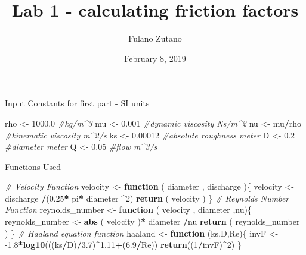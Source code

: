 \documentclass[
]{article}
\title{Lab 1 - calculating friction factors}
\author{Fulano Zutano}
\date{February 8, 2019}
\newenvironment{Shaded}{\begin{snugshade}}{\end{snugshade}}
\newcommand{\CommentTok}[1]{\textcolor[rgb]{0.56,0.35,0.01}{\textit{#1}}}
\newcommand{\ControlFlowTok}[1]{\textcolor[rgb]{0.13,0.29,0.53}{\textbf{#1}}}
\newcommand{\DecValTok}[1]{\textcolor[rgb]{0.00,0.00,0.81}{#1}}
\newcommand{\FloatTok}[1]{\textcolor[rgb]{0.00,0.00,0.81}{#1}}
\newcommand{\KeywordTok}[1]{\textcolor[rgb]{0.13,0.29,0.53}{\textbf{#1}}}
\newcommand{\NormalTok}[1]{#1}
\newcommand{\OperatorTok}[1]{\textcolor[rgb]{0.81,0.36,0.00}{\textbf{#1}}}
\newcommand{\StringTok}[1]{\textcolor[rgb]{0.31,0.60,0.02}{#1}}
\begin{document}
\maketitle

Input Constants for first part - SI units

\begin{Shaded}
\begin{Highlighting}[]
\NormalTok{rho <-}\StringTok{ }\FloatTok{1000.0}    \CommentTok{#kg/m^3}
\NormalTok{mu <-}\StringTok{ }\FloatTok{0.001}      \CommentTok{#dynamic viscosity Ns/m^2}
\NormalTok{nu <-}\StringTok{ }\NormalTok{mu}\OperatorTok{/}\NormalTok{rho     }\CommentTok{#kinematic viscosity m^2/s}
\NormalTok{ks <-}\StringTok{ }\FloatTok{0.00012}    \CommentTok{#absolute roughness meter}
\NormalTok{D <-}\StringTok{ }\FloatTok{0.2}         \CommentTok{#diameter meter}
\NormalTok{Q <-}\StringTok{ }\FloatTok{0.05}        \CommentTok{#flow m^3/s}
\end{Highlighting}
\end{Shaded}

Functions Used

\begin{Shaded}
\begin{Highlighting}[]
\CommentTok{# Velocity Function}
\NormalTok{velocity <-}\StringTok{ }\ControlFlowTok{function}\NormalTok{ ( diameter , discharge )\{}
\NormalTok{  velocity <-}\StringTok{ }\NormalTok{discharge }\OperatorTok{/}\NormalTok{(}\FloatTok{0.25}\OperatorTok{*}\StringTok{ }\NormalTok{pi}\OperatorTok{*}\StringTok{ }\NormalTok{diameter }\OperatorTok{^}\DecValTok{2}\NormalTok{)}
  \KeywordTok{return}\NormalTok{ ( velocity )}
\NormalTok{\}}
\CommentTok{# Reynolds Number Function}
\NormalTok{reynolds_number <-}\StringTok{ }\ControlFlowTok{function}\NormalTok{ ( velocity , diameter ,nu)\{}
\NormalTok{  reynolds_number <-}\StringTok{ }\KeywordTok{abs}\NormalTok{ ( velocity )}\OperatorTok{*}\StringTok{ }\NormalTok{diameter }\OperatorTok{/}\NormalTok{nu}
  \KeywordTok{return}\NormalTok{ ( reynolds_number )}
\NormalTok{\}}
\CommentTok{# Haaland equation function}
\NormalTok{haaland <-}\StringTok{ }\ControlFlowTok{function}\NormalTok{ (ks,D,Re)\{}
\NormalTok{  invF <-}\StringTok{ }\FloatTok{-1.8}\OperatorTok{*}\KeywordTok{log10}\NormalTok{(((ks}\OperatorTok{/}\NormalTok{D)}\OperatorTok{/}\FloatTok{3.7}\NormalTok{)}\OperatorTok{^}\FloatTok{1.11}\OperatorTok{+}\NormalTok{(}\FloatTok{6.9}\OperatorTok{/}\NormalTok{Re))}
  \KeywordTok{return}\NormalTok{((}\DecValTok{1}\OperatorTok{/}\NormalTok{invF)}\OperatorTok{^}\DecValTok{2}\NormalTok{)}
\NormalTok{\}}
\end{Highlighting}
\end{Shaded}
\end{document}
